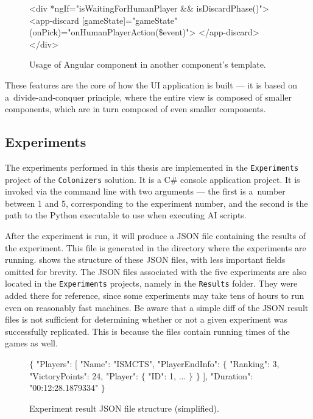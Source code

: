 \begin{figure}[ht]
\begin{code}[commandchars=\\\{\},codes={\catcode`\$=3\catcode`\^=7\catcode`\_=8}]
<div *ngIf="isWaitingForHumanPlayer && isDiscardPhase()">
    <app-discard [gameState]="gameState"
                 (onPick)="onHumanPlayerAction(\$event)">
    </app-discard>
</div>
\end{code}
\caption{Usage of Angular component in another component's template.}\label{dd:componentref}
\end{figure}

These features are the core of how the UI application is built --- it is based on
a~divide-and-conquer principle, where the entire view is composed of smaller components,
which are in turn composed of even smaller components. 

\clearpage
\subsection{Experiments}
\label{chap:experimentdocs}

The experiments performed in this thesis are implemented in the \texttt{Experiments}
project of the \texttt{Colonizers} solution. It is a C\# console application project.
It is invoked via the command line with two arguments --- the first is a~number
between 1 and 5, corresponding to the experiment number, and the second
is the path to the Python executable to use when executing AI scripts.

After the experiment is run, it will produce a JSON file containing the results
of the experiment. This file is generated in the directory where the experiments
are running.
 shows the structure of these JSON files, with less
important fields omitted for brevity. The JSON files associated with the five
experiments are also located in the \texttt{Experiments} projects, namely in
the \texttt{Results} folder. They were added there for reference, since
some experiments may take tens of hours to run even on reasonably fast
machines. Be aware that a simple diff of the JSON result files
is not sufficient for determining whether or not a given experiment was successfully
replicated. This is because the files contain running times of the games as well.

\begin{figure}[ht]
\begin{code}[commandchars=\\\{\},codes={\catcode`\$=3\catcode`\^=7\catcode`\_=8}]
$\{$
    "Players": [
        "Name": "ISMCTS",
        "PlayerEndInfo": $\{$
            "Ranking": 3,
            "VictoryPoints": 24,
            "Player": $\{$
                "ID": 1,
                ...
            $\}$
        $\}$
    ],
    "Duration": "00:12:28.1879334"
$\}$
\end{code}
\caption{Experiment result JSON file structure (simplified).}\label{dd:experimentjson}
\end{figure}


